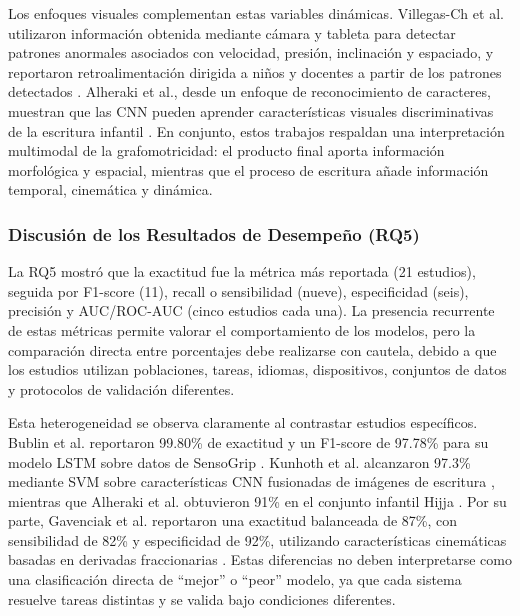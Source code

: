 \documentclass{iaesarticle}
\begin{document}
Los enfoques visuales complementan estas variables dinámicas. Villegas-Ch et
al. utilizaron información obtenida mediante cámara y tableta para detectar
patrones anormales asociados con velocidad, presión, inclinación y espaciado,
y reportaron retroalimentación dirigida a niños y docentes a partir de los
patrones detectados \cite{Villegas-Ch2023}. Alheraki et al., desde un enfoque de reconocimiento de
caracteres, muestran que las CNN pueden aprender características visuales
discriminativas de la escritura infantil \cite{Alheraki2023}. En conjunto,
estos trabajos respaldan una interpretación multimodal de la grafomotricidad:
el producto final aporta información morfológica y espacial, mientras que el
proceso de escritura añade información temporal, cinemática y dinámica.

\subsubsection{Discusión de los Resultados de Desempeño (RQ5)}

La RQ5 mostró que la exactitud fue la métrica más reportada (21 estudios),
seguida por F1-score (11), recall o sensibilidad (nueve), especificidad
(seis), precisión y AUC/ROC-AUC (cinco estudios cada una). La presencia
recurrente de estas métricas permite valorar el comportamiento de los modelos,
pero la comparación directa entre porcentajes debe realizarse con cautela,
debido a que los estudios utilizan poblaciones, tareas, idiomas, dispositivos,
conjuntos de datos y protocolos de validación diferentes.

Esta heterogeneidad se observa claramente al contrastar estudios específicos.
Bublin et al. reportaron 99.80\% de exactitud y un F1-score de 97.78\% para su
modelo LSTM sobre datos de SensoGrip \cite{Bublin2023}. Kunhoth et al.
alcanzaron 97.3\% mediante SVM sobre características CNN fusionadas de imágenes
de escritura \cite{Kunhoth2023a}, mientras que Alheraki et al. obtuvieron 91\%
en el conjunto infantil Hijja \cite{Alheraki2023}. Por su parte, Gavenciak et
al. reportaron una exactitud balanceada de 87\%, con sensibilidad de 82\% y
especificidad de 92\%, utilizando características cinemáticas basadas en
derivadas fraccionarias \cite{Gavenciak2025}. Estas diferencias no deben
interpretarse como una clasificación directa de ``mejor'' o ``peor'' modelo,
ya que cada sistema resuelve tareas distintas y se valida bajo condiciones
diferentes.
\end{document}
